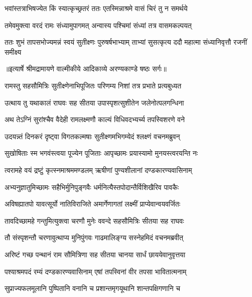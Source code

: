\twolineshloka
{भवांस्तत्राभिषज्येत किं स्यात्कृच्छ्रतरं ततः}
{एतस्मिन्नाश्रमे वासं चिरं तु न समर्थये} %

\twolineshloka
{तमेवमुक्त्वा वरदं रामः संध्यामुपागमत्}
{अन्वास्य पश्चिमां संध्यां तत्र वासमकल्पयत्} %

\fourlineindentedshloka
{ततः शुभं तापसभोज्यमन्नं}
{ स्वयं सुतीक्ष्णः पुरुषर्षभाभ्याम्}
{ताभ्यां सुसत्कृत्य ददौ महात्मा}
{ संध्यानिवृत्तौ रजनीं समीक्ष्य} %


{॥इत्यार्षे श्रीमद्रामायणे वाल्मीकीये आदिकाव्ये अरण्यकाण्डे षष्ठः सर्गः॥}


\twolineshloka
{रामस्तु सहसौमित्रिः सुतीक्ष्णेनाभिपूजितः}
{परिणम्य निशां तत्र प्रभाते प्रत्यबुध्यत} %

\twolineshloka
{उत्थाय तु यथाकालं राघवः सह सीतया}
{उपास्पृशत्सुशीतेन जलेनोत्पलगन्धिना} %

\twolineshloka
{अथ तेऽग्निं सुरांश्चैव वैदेही रामलक्ष्मणौ}
{काल्यं विधिवदभ्यर्च्य तपस्विशरणे वने} %

\twolineshloka
{उदयन्न्तं दिनकरं दृष्ट्वा विगतकल्मषाः}
{सुतीक्ष्णमभिगम्येदं श्लक्ष्णं वचनमब्रुवन्} %

\twolineshloka
{सुखोषिताः स्म भगवंस्त्वया पूज्येन पूजिताः}
{आपृच्छामः प्रयास्यामो मुनयस्त्वरयन्ति नः} %

\twolineshloka
{त्वरामहे वयं द्रष्टुं कृत्स्नमाश्रममण्डलम्}
{ऋषीणां पुण्यशीलानां दण्डकारण्यवासिनाम्} %

\twolineshloka
{अभ्यनुज्ञातुमिच्छामः सहैभिर्मुनिपुङ्गवैः}
{धर्मनित्यैस्तपोदान्तैर्विशिखैरिव पावकैः} %

\twolineshloka
{अविषह्यातपो यावत्सूर्यो नातिविराजिते}
{अमार्गेणागतां लक्ष्मीं प्राप्येवान्वयवर्जितः} %

\twolineshloka
{तावदिच्छामहे गन्तुमित्युक्त्वा चरणौ मुनेः}
{ववन्दे सहसौमित्रिः सीतया सह राघवः} %

\twolineshloka
{तौ संस्पृशन्तौ चरणावुत्थाप्य मुनिपुंगवः}
{गाढमालिङ्ग्य सस्नेहमिदं वचनमब्रवीत्} %

\twolineshloka
{अरिष्टं गच्छ पन्थानं राम सौमित्रिणा सह}
{सीतया चानया सार्धं छाययेवानुवृत्तया} %

\twolineshloka
{पश्याश्रमपदं रम्यं दण्डकारण्यवासिनाम्}
{एषां तपस्विनां वीर तपसा भावितात्मनाम्} %

\twolineshloka
{सुप्राज्यफलमूलानि पुष्पितानि वनानि च}
{प्रशान्तमृगयूथानि शान्तपक्षिगणानि च} %

